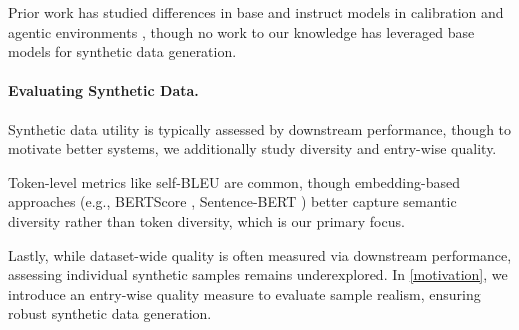 Prior work has studied differences in base and instruct models in calibration \cite{openai2024gpt4technicalreport} and agentic environments \cite{li2024predictingvsactingtradeoff}, though no work to our knowledge has leveraged base models for synthetic data generation.

\paragraph{Evaluating Synthetic Data.} Synthetic data utility is typically assessed by downstream performance, though to motivate better systems, we additionally study diversity and entry-wise quality.

Token-level metrics like self-BLEU \cite{zhu2018texygen} are common, though embedding-based approaches (e.g., BERTScore \cite{zhang2019bertscore}, Sentence-BERT \cite{reimers2019sentence}) better capture semantic diversity rather than token diversity, which is our primary focus.

Lastly, while dataset-wide quality is often measured via downstream performance, assessing individual synthetic samples remains underexplored. In \cref{motivation}, we introduce an entry-wise quality measure to evaluate sample realism, ensuring robust synthetic data generation.
